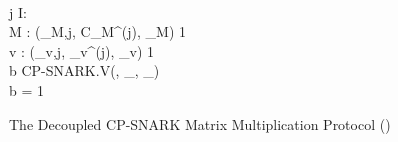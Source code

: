 \begin{figure}[ht!]
{{{\\
\< \<  j \in I: 
\\
\< \< \quad {} M \in {}: \merkleV(\pi_{M,j}, C_M^{(j)}, \cm_M)  1 
\\
\< \< \quad {} v \in {}: \merkleV(\pi_{v,j}, \enc_v^{(j)}, \cm_v)  1
\\
\< \< b \gets \textsf{CP-SNARK.V}(\para, \stmt_{}, \pi_{}) 
\\
\< \<  b = 1
}
}
} 
\caption{The Decoupled CP-SNARK Matrix Multiplication Protocol (\protocol)}
\end{figure}